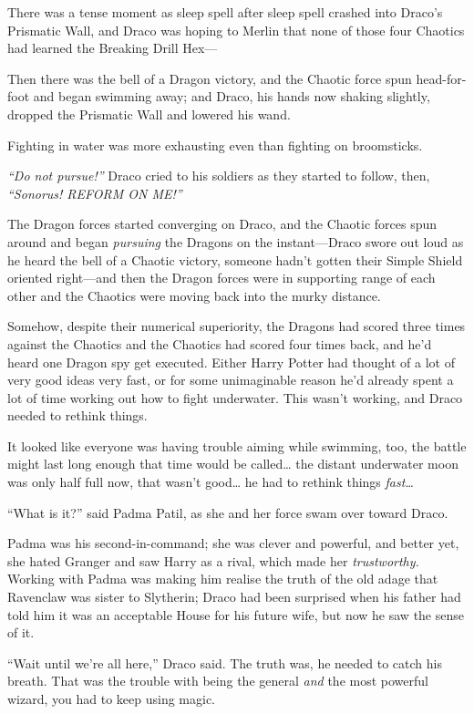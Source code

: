 There was a tense moment as sleep spell after sleep spell crashed into
Draco's Prismatic Wall, and Draco was hoping to Merlin that none of
those four Chaotics had learned the Breaking Drill Hex---

Then there was the bell of a Dragon victory, and the Chaotic force spun
head-for-foot and began swimming away; and Draco, his hands now shaking
slightly, dropped the Prismatic Wall and lowered his wand.

Fighting in water was more exhausting even than fighting on broomsticks.

\emph{``Do not pursue!''} Draco cried to his soldiers as they started to
follow, then, \emph{``Sonorus! REFORM ON ME!''}

The Dragon forces started converging on Draco, and the Chaotic forces
spun around and began \emph{pursuing} the Dragons on the instant---Draco
swore out loud as he heard the bell of a Chaotic victory, someone hadn't
gotten their Simple Shield oriented right---and then the Dragon forces
were in supporting range of each other and the Chaotics were moving back
into the murky distance.

Somehow, despite their numerical superiority, the Dragons had scored
three times against the Chaotics and the Chaotics had scored four times
back, and he'd heard one Dragon spy get executed. Either Harry Potter
had thought of a lot of very good ideas very fast, or for some
unimaginable reason he'd already spent a lot of time working out how to
fight underwater. This wasn't working, and Draco needed to rethink
things.

It looked like everyone was having trouble aiming while swimming, too,
the battle might last long enough that time would be called\ldots{} the
distant underwater moon was only half full now, that wasn't good\ldots{}
he had to rethink things \emph{fast\ldots{}}

``What is it?'' said Padma Patil, as she and her force swam over toward
Draco.

Padma was his second-in-command; she was clever and powerful, and better
yet, she hated Granger and saw Harry as a rival, which made her
\emph{trustworthy.} Working with Padma was making him realise the truth
of the old adage that Ravenclaw was sister to Slytherin; Draco had been
surprised when his father had told him it was an acceptable House for
his future wife, but now he saw the sense of it.

``Wait until we're all here,'' Draco said. The truth was, he needed to
catch his breath. That was the trouble with being the general \emph{and}
the most powerful wizard, you had to keep using magic.


